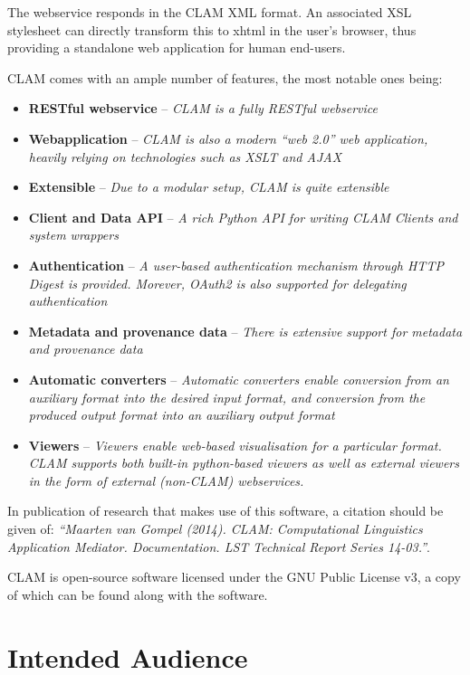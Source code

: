 \documentclass[a4paper,12pt]{report}
\begin{document}
The webservice responds in the CLAM XML format. An associated XSL stylesheet
\citep{XSLT} can directly transform this to xhtml in the user's browser, thus
providing a standalone web application for human end-users. 

CLAM comes with an ample number of features, the most notable ones being:

\begin{itemize}
\item \textbf{RESTful webservice} -- \emph{CLAM is a fully RESTful webservice}
\item \textbf{Webapplication} -- \emph{CLAM is also a modern ``web 2.0'' web application, heavily relying on technologies such as XSLT and AJAX}
\item \textbf{Extensible} -- \emph{Due to a modular setup, CLAM is quite extensible}
\item \textbf{Client and Data API} -- \emph{A rich Python API for writing CLAM Clients and system wrappers}
\item \textbf{Authentication} -- \emph{A user-based authentication mechanism
  through HTTP Digest is provided. Morever, OAuth2 is also supported for delegating
  authentication}
\item \textbf{Metadata and provenance data} -- \emph{There is extensive support for metadata and provenance data}
\item \textbf{Automatic converters} -- \emph{Automatic converters enable conversion from an auxiliary format into the desired input format, and conversion from the produced output format into an auxiliary output format}
\item \textbf{Viewers} -- \emph{Viewers enable web-based visualisation for a particular format. CLAM supports both built-in python-based viewers as well as external viewers in the form of external (non-CLAM) webservices.}
\end{itemize}

In publication of research that makes use of this software, a citation should
be given of: {\em ``Maarten van Gompel (2014). CLAM: Computational Linguistics
Application Mediator. Documentation. LST Technical Report Series 14-03.''}.

CLAM is open-source software licensed under the GNU Public License v3, a copy
of which can be found along with the software.

\section{Intended Audience}
\end{document}
